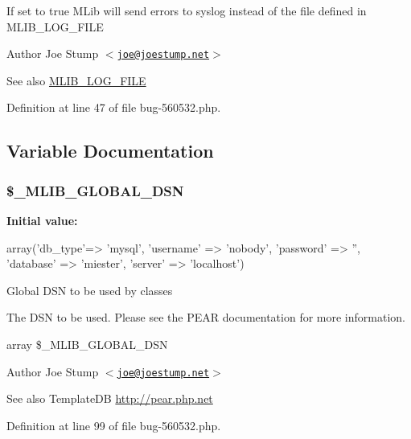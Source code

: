 \-If set to true \-M\-Lib will send errors to syslog instead of the file defined in \-M\-L\-I\-B\-\_\-\-L\-O\-G\-\_\-\-F\-I\-L\-E

\begin{DoxyAuthor}{\-Author}
\-Joe \-Stump $<$\href{mailto:joe@joestump.net}{\tt joe@joestump.\-net}$>$ 
\end{DoxyAuthor}
\begin{DoxySeeAlso}{\-See also}
\hyperlink{bug-560532_8php_ae6ff542323c614333b346e035a1700c7}{\-M\-L\-I\-B\-\_\-\-L\-O\-G\-\_\-\-F\-I\-L\-E} 
\end{DoxySeeAlso}


\-Definition at line 47 of file bug-\/560532.\-php.



\subsection{\-Variable \-Documentation}
\hypertarget{bug-560532_8php_a30d6055aa7b520c871c09eca9bbb1b52}{
\subsubsection[{\$\-\_\-\-M\-L\-I\-B\-\_\-\-G\-L\-O\-B\-A\-L\-\_\-\-D\-S\-N}]{\setlength{\rightskip}{0pt plus 5cm}\$\-\_\-\-M\-L\-I\-B\-\_\-\-G\-L\-O\-B\-A\-L\-\_\-\-D\-S\-N}}\label{bug-560532_8php_a30d6055aa7b520c871c09eca9bbb1b52}
{\bfseries \-Initial value\-:}
\begin{DoxyCode}
 array('db_type'=> 'mysql',
                            'username' => 'nobody',
                            'password' => '',
                            'database' => 'miester',
                            'server' => 'localhost')
\end{DoxyCode}
\-Global \-D\-S\-N to be used by classes

\-The \-D\-S\-N to be used. \-Please see the \-P\-E\-A\-R documentation for more information.

array \$\-\_\-\-M\-L\-I\-B\-\_\-\-G\-L\-O\-B\-A\-L\-\_\-\-D\-S\-N \begin{DoxyAuthor}{\-Author}
\-Joe \-Stump $<$\href{mailto:joe@joestump.net}{\tt joe@joestump.\-net}$>$ 
\end{DoxyAuthor}
\begin{DoxySeeAlso}{\-See also}
\-Template\-D\-B \hyperlink{}{http\-://pear.\-php.\-net}
\end{DoxySeeAlso}


\-Definition at line 99 of file bug-\/560532.\-php.


